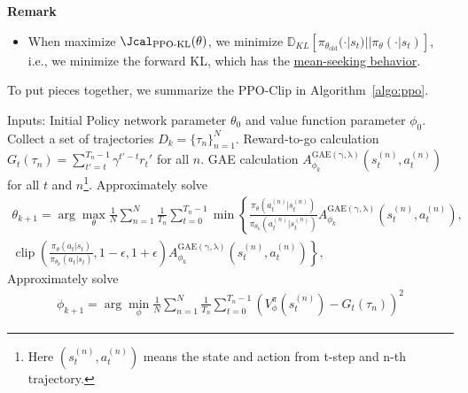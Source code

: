 \textbf{Remark}
\begin{itemize}
    \item When maximize $\Jcal_{\text{PPO-KL}}(\theta)$, we minimize $\mathbb{D}_{K L}\left[\pi_{\theta_{\text{old}}}(\cdot|s_t)| | \pi_{\theta}(\cdot|s_t)\right]$, i.e., we minimize the forward KL, which has the \href{https://www.tuananhle.co.uk/notes/reverse-forward-kl.html}{mean-seeking behavior}.
\end{itemize}



To put pieces together, we summarize the PPO-Clip in Algorithm~\ref{algo:ppo}.
\begin{algorithm}[H]
\caption{PPO-Clip Algorithm}
\begin{algorithmic}[1]
    \State Inputs: Initial Policy network parameter $\theta_0$ and value function parameter $\phi_0$.
        \State Collect a set of trajectories $D_k=\{\tau_n\}_{n=1}^{N}$.
        \State Reward-to-go calculation $G_t(\tau_n) = \sum_{t'=t}^{T_n-1}\gamma^{t'-t}r_t'$ for all $n$.
         \State GAE calculation $A^{\operatorname{GAE(\gamma,\lambda)}}_{\phi_k}(s_t^{(n)},a_t^{(n)})$ for all $t$ and $n$\footnote{Here $(s_t^{(n)},a_t^{(n)})$ means the state and action from t-step and n-th trajectory.}. 
        \State Approximately solve 
            \begin{align*}
                 \theta_{k+1}=\arg\max_{\theta} \frac{1}{N}\sum_{n=1}^{N}\frac{1}{T_n}
                  \sum_{t=0}^{T_n-1}  
                 \min\left\{\frac{\pi_{\theta}(a_t^{(n)}|s_t^{(n)})}{\pi_{\theta_{k}}(a_t^{(n)}|s_t^{(n)})}A^{\operatorname{GAE(\gamma,\lambda)}}_{\phi_k}(s_t^{(n)},a_t^{(n)}),  \right.
                 \\
                 \left.\operatorname{clip}\left(\frac{\pi_{\theta}(a_t|s_t)}{\pi_{\theta_{k}}(a_t|s_t)}, 1-\epsilon, 1+\epsilon\right)
                 A^{\operatorname{GAE(\gamma,\lambda)}}_{\phi_k}(s_t^{(n)},a_t^{(n)})\right\},
            \end{align*}
        \State Approximately solve 
            \begin{align*}
                \phi_{k+1}=\arg\min_{\phi} \frac{1}{N}\sum_{n=1}^{N}\frac{1}{T_n}
                  \sum_{t=0}^{T_n-1}(V^{\pi}_{\phi}(s_t^{(n)}) - G_t(\tau_n))^2
            \end{align*}
    \EndFor
\end{algorithmic}
\label{algo:ppo}
\end{algorithm}

